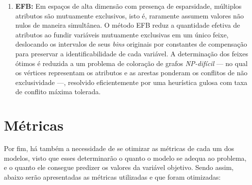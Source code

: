 \begin{enumerate}
    \item \textbf{\gls{EFB}:} Em espaços de alta dimensão com presença de esparsidade, múltiplos atributos são mutuamente exclusivos, isto é, raramente assumem valores não nulos de maneira simultânea. O método EFB reduz a quantidade efetiva de atributos ao fundir variáveis mutuamente exclusivas em um único feixe, deslocando os intervalos de seus \textit{bins} originais por constantes de compensação para preservar a identificabilidade de cada variável. A determinação dos feixes ótimos é reduzida a um problema de coloração de grafos \textit{NP-difícil} — no qual os vértices representam os atributos e as arestas ponderam os conflitos de não exclusividade —, resolvido eficientemente por uma heurística gulosa com taxa de conflito máxima tolerada.
\end{enumerate}

\section{Métricas}

Por fim, há também a necessidade de se otimizar as métricas de cada um dos modelos, visto que esses determinarão o quanto o modelo se adequa ao problema, e o quanto ele consegue predizer os valores da variável objetivo. Sendo assim, abaixo serão apresentadas as métricas utilizadas e que foram otimizadas:

